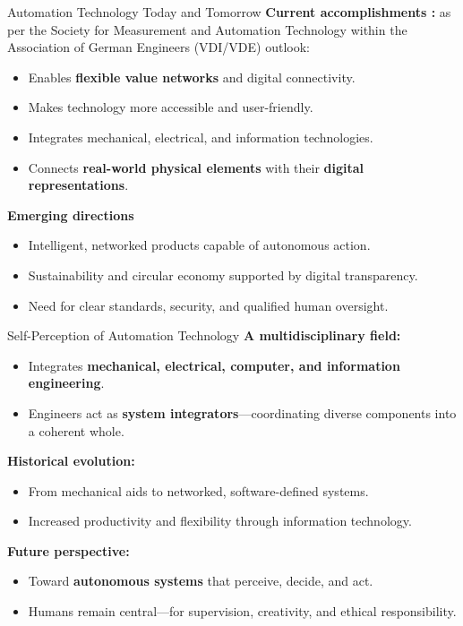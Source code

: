 \begin{frame}{Automation Technology Today and Tomorrow}
\textbf{Current accomplishments :} as per the Society for Measurement and Automation Technology within the Association of German Engineers (VDI/VDE) outlook:
\begin{itemize}
  \item Enables \textbf{flexible value networks} and digital connectivity.
  \item Makes technology more accessible and user-friendly.
  \item Integrates mechanical, electrical, and information technologies.
  \item Connects \textbf{real-world physical elements} with their \textbf{digital representations}.
\end{itemize}

\vspace{3mm}
\textbf{Emerging directions}
\begin{itemize}
  \item Intelligent, networked products capable of autonomous action.
  \item Sustainability and circular economy supported by digital transparency.
  \item Need for clear standards, security, and qualified human oversight.
\end{itemize}
\end{frame}

\begin{frame}{Self-Perception of Automation Technology}
\textbf{A multidisciplinary field:}
\begin{itemize}
  \item Integrates \textbf{mechanical, electrical, computer, and information engineering}.
  \item Engineers act as \textbf{system integrators}—coordinating diverse components into a coherent whole.
\end{itemize}

\vspace{3mm}
\textbf{Historical evolution:}
\begin{itemize}
  \item From mechanical aids to networked, software-defined systems.
  \item Increased productivity and flexibility through information technology.
\end{itemize}

\vspace{3mm}
\textbf{Future perspective:}
\begin{itemize}
  \item Toward \textbf{autonomous systems} that perceive, decide, and act.
  \item Humans remain central—for supervision, creativity, and ethical responsibility.
\end{itemize}
\end{frame}




